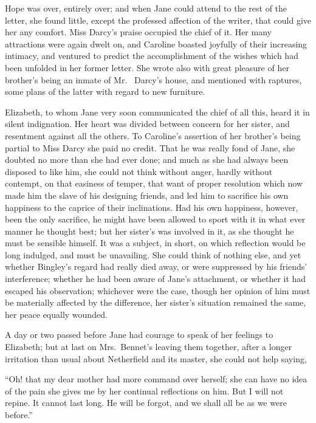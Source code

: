 Hope was over, entirely over; and when Jane could
attend to the rest of the letter, she found little, except
the professed affection of the writer, that could give her
any comfort. Miss Darcy’s praise occupied the chief of it.
Her many attractions were again dwelt on, and Caroline
boasted joyfully of their increasing intimacy, and ventured
to predict the accomplishment of the wishes which had
been unfolded in her former letter. She wrote also with
great pleasure of her brother’s being an inmate of Mr.\ %
Darcy’s house, and mentioned with raptures, some plans
of the latter with regard to new furniture.

Elizabeth, to whom Jane very soon communicated the
chief of all this, heard it in silent indignation. Her heart
was divided between concern for her sister, and resentment
against all the others. To Caroline’s assertion of her
brother’s being partial to Miss Darcy she paid no credit.
That he was really fond of Jane, she doubted no more than
she had ever done; and much as she had always been
disposed to like him, she could not think without anger,
hardly without contempt, on that easiness of temper, that
want of proper resolution which now made him the slave
of his designing friends, and led him to sacrifice his own
happiness to the caprice of their inclinations. Had his
own happiness, however, been the only sacrifice, he might
have been allowed to sport with it in what ever manner
he thought best; but her sister’s was involved in it, as
she thought he must be sensible himself. It was a subject,
in short, on which reflection would be long indulged, and
must be unavailing. She could think of nothing else, and
yet whether Bingley’s regard had really died away, or
were suppressed by his friends’ interference; whether
he had been aware of Jane’s attachment, or whether it
had escaped his observation; whichever were the case,
though her opinion of him must be materially affected
by the difference, her sister’s situation remained the same,
her peace equally wounded.

A day or two passed before Jane had courage to speak
of her feelings to Elizabeth; but at last on Mrs.\ Bennet’s
leaving them together, after a longer irritation than usual
about Netherfield and its master, she could not help
saying,

“Oh! that my dear mother had more command over
herself; she can have no idea of the pain she gives me
by her continual reflections on him. But I will not
repine. It cannot last long. He will be forgot, and we
shall all be as we were before.”

